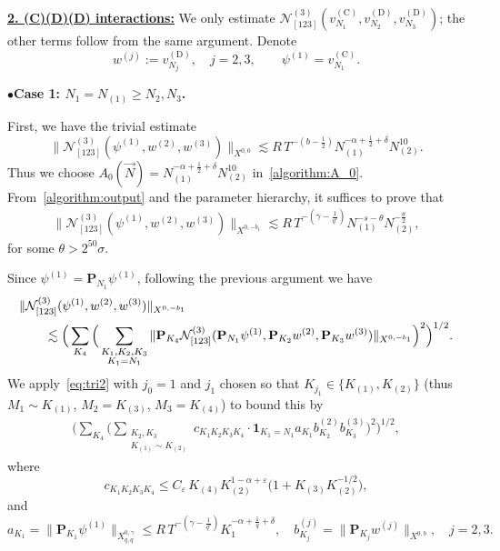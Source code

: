 \documentclass[11pt,reqno,english]{amsart}
\numberwithin{equation}{section}
\theoremstyle{plain}
\theoremstyle{definition}
\theoremstyle{remark}
\renewcommand{\epsilon}{\varepsilon}
\newcommand{\noi}{\noindent}
\begin{document}
	
	
	\underline{\textbf{2. (C)(D)(D) interactions:}} We only estimate $\mathcal{N}_{[123]}^{(3)}(v_{N_1}^{(\mathrm{C})},v_{N_2}^{(\mathrm{D})},v_{N_3}^{(\mathrm{D})})$; the other terms follow from the same argument. Denote
\[
w^{(j)}:=v_{N_j}^{(\mathrm{D})}, \quad j=2,3,\qquad \psi^{(1)}=v_{N_1}^{(\mathrm{C})}.
\]



\noi
$\bullet${\bf Case 1: $N_1= N_{(1)}\geq N_2, N_3$.}

First, we have the trivial estimate
\[
\|\mathcal{N}_{[123]}^{(3)}(\psi^{(1)},w^{(2)},w^{(3)})\|_{X^{0,0}}\lesssim R\, T^{-(b-\frac{1}{2})}N_{(1)}^{-\alpha+\frac{1}{2}+\delta}N_{(2)}^{10}.
\]
Thus we choose $A_0(\vec{N})=N_{(1)}^{-\alpha+\frac{1}{2}+\delta}N_{(2)}^{10}$ in~\eqref{algorithm:A_0}. From~\eqref{algorithm:output} and the parameter hierarchy, it suffices to prove that
\begin{align}\label{pf(2)A1bound}
	\|\mathcal{N}_{[123]}^{(3)}(\psi^{(1)},w^{(2)},w^{(3)})\|_{X^{0,-b_1}}\lesssim R\, T^{-(\gamma-\frac{1}{q'})}N_{(1)}^{-s-\theta}N_{(2)}^{-\frac{\theta}{2}},
\end{align}
for some $\theta>2^{50}\sigma$.

Since $\psi^{(1)}=\mathbf{P}_{N_1}\psi^{(1)}$, following the previous argument we have
\begin{align}
	&\|\mathcal{N}_{[123]}^{(3)}(\psi^{(1)},w^{(2)},w^{(3)})\|_{X^{0,-b_1}}\notag  \\ &\qquad\lesssim
	\Big(\sum_{K_4}\Big(\sum_{\substack{K_1,K_2,K_3\\ K_1=N_1}}\|
	\mathbf{P}_{K_4}\mathcal{N}_{[123]}^{(3)}(\mathbf{P}_{N_1}\psi^{(1)},
	\mathbf{P}_{K_2}w^{(2)},
	\mathbf{P}_{K_3}w^{(3)})
	\|_{X^{0,-b_1}}\Big)^2\Big)^{1/2}. \label{N[123](3)dyadicsum}
\end{align}
We apply~\eqref{eq:tri2} with $j_0=1$ and $j_1$ chosen so that $K_{j_1}\in\{K_{(1)},K_{(2)}\}$ (thus $M_1\sim K_{(1)}$, $M_2=K_{(3)}$, $M_3=K_{(4)}$) to bound this by
\begin{align}\label{control(2):case1}
	\Big(\sum_{K_4}
	\Big(
	\sum_{\substack{K_2,K_3\\
			K_{(1)}\sim K_{(2)}
	}} c_{K_1 K_2 K_3 K_4}\cdot \mathbf{1}_{K_1=N_1}
	a_{K_1}b_{K_2}^{(2)}b_{K_3}^{(3)}
	\Big)^2
	\Big)^{1/2},
\end{align}
where
\[
c_{K_1 K_2 K_3 K_4}\leq C_{\epsilon}\, K_{(4)}K_{(2)}^{1-\alpha+\epsilon}\big(1+K_{(3)}K_{(2)}^{-1/2}\big),
\]
and
\[
a_{K_1}=\|\mathbf{P}_{K_1}\psi^{(1)}\|_{X_{q,q}^{0,\gamma}}\leq R\, T^{-(\gamma-\frac{1}{q'})}K_{1}^{-\alpha+\frac{1}{q}+\delta},\quad b_{K_j}^{(j)}=\|\mathbf{P}_{K_j}w^{(j)}\|_{X^{0,b}},\quad j=2,3.
\]
\end{document}
